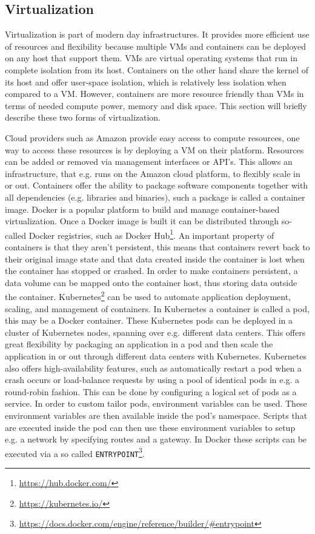 \subsection{Virtualization}
\label{overview-virtualization}
Virtualization is part of modern day infrastructures. It provides more efficient use of resources and flexibility because multiple VMs and containers can be deployed on any host that support them. VMs are virtual operating systems that run in complete isolation from its host. Containers on the other hand share the kernel of its host and offer user-space isolation, which is relatively less isolation when compared to a VM. However, containers are more resource friendly than VMs in terms of needed compute power, memory and disk space. This section will briefly describe these two forms of virtualization.

Cloud providers such as Amazon provide easy access to compute resources, one way to access these resources is by deploying a VM on their platform. Resources can be added or removed via management interfaces or API's. This allows an infrastructure, that e.g. runs on the Amazon cloud platform, to flexibly scale in or out. Containers offer the ability to package software components together with all dependencies (e.g. libraries and binaries), such a package is called a container image. Docker is a popular platform to build and manage container-based virtualization. Once a Docker image is built it can be distributed through so-called Docker registries, such as Docker Hub\footnote{\url{https://hub.docker.com/}}. An important property of containers is that they aren't persistent, this means that containers revert back to their original image state and that data created inside the container is lost when the container has stopped or crashed. In order to make containers persistent, a data volume can be mapped onto the container host, thus storing data outside the container. Kubernetes\footnote{\url{https://kubernetes.io/}} can be used to automate application deployment, scaling, and management of containers. In Kubernetes a container is called a pod, this may be a Docker container. These Kubernetes pods can be deployed in a cluster of Kubernetes nodes, spanning over e.g. different data centers. This offers great flexibility by packaging an application in a pod and then scale the application in or out through different data centers with Kubernetes. Kubernetes also offers high-availability features, such as automatically restart a pod when a crash occurs or load-balance requests by using a pool of identical pods in e.g. a round-robin fashion. This can be done by configuring a logical set of pods as a service. In order to custom tailor pods, environment variables can be used. These environment variables are then available inside the pod's namespace. Scripts that are executed inside the pod can then use these environment variables to setup e.g. a network by specifying routes and a gateway. In Docker these scripts can be executed via a so called \texttt{ENTRYPOINT}\footnote{\url{https://docs.docker.com/engine/reference/builder/\#entrypoint}}.

